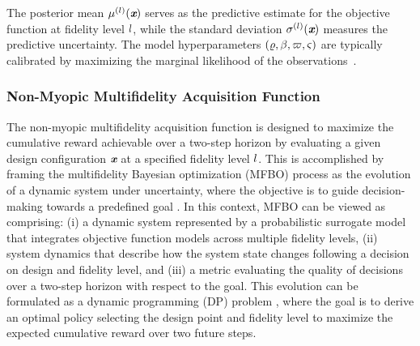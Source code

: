 The posterior mean $\mu^{(l)}(\textbf{\em x})$ serves as the predictive estimate for the objective function at fidelity level $l$, while the standard deviation $\sigma^{(l)}(\textbf{\em x})$ measures the predictive uncertainty. The model hyperparameters $(\varrho, \beta, \varpi, \varsigma)$ are typically calibrated by maximizing the marginal likelihood of the observations~\cite{ForresterAl2008}.

\subsubsection{Non-Myopic Multifidelity Acquisition Function}
\label{s:NMAF}

The non-myopic multifidelity acquisition function is designed to maximize the cumulative reward achievable over a two-step horizon by evaluating a given design configuration \(\textbf{\em x}\) at a specified fidelity level \(l\). This is accomplished by framing the multifidelity Bayesian optimization (MFBO) process as the evolution of a dynamic system under uncertainty, where the objective is to guide decision-making towards a predefined goal \cite{DiFioreMaininiNM2BO}. In this context, MFBO can be viewed as comprising: (i) a dynamic system represented by a probabilistic surrogate model that integrates objective function models across multiple fidelity levels, (ii) system dynamics that describe how the system state changes following a decision on design and fidelity level, and (iii) a metric evaluating the quality of decisions over a two-step horizon with respect to the goal.
This evolution can be formulated as a dynamic programming (DP) problem \cite{Bertsekas1995, Powell2007}, where the goal is to derive an optimal policy selecting the design point and fidelity level to maximize the expected cumulative reward over two future steps.

